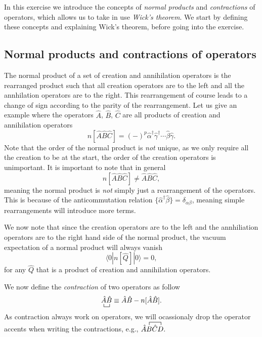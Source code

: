 \documentclass[a4paper, 11pt, notitlepage, english]{article}
\newcommand{\op}[1]{\hat{#1}}
\newcommand{\braopket}[3]{\langle #1 | {#2} | #3 \rangle}
\begin{document}
In this exercise we introduce the concepts of \emph{normal products} and \emph{contractions} of operators, which allows us to take in use \emph{Wick's theorem}. We start by defining these concepts and explaining Wick's theorem, before going into the exercise.

\subsection*{Normal products and contractions of operators}
The normal product of a set of creation and annihilation operators is the rearranged product such that all creation operators are to the left and all the annhilation operators are to the right. This rearrangement of course leads to a change of sign according to the parity of the rearrangement. Let us give an example where the operators $\op{A}$, $\op{B}$, $\op{C}$ are all products of creation and annihilation operators
$$n[\op{A}\op{B}\op{C}] = (-)^p \op{\alpha}^\dag \op{\gamma}^\dag \cdots \op{\beta}\op{\gamma}.$$
Note that the order of the normal product is \emph{not} unique, as we only require all the creation to be at the start, the order of the creation operators is unimportant. It is important to note that in general 
$$n[\op{A}\op{B}\op{C}] \neq \op{A}\op{B}\op{C},$$
meaning the normal product is \emph{not} simply just a rearrangement of the operators. This is because of the anticommutation relation $\{\op{\alpha}^\dag \op{\beta}\} = \delta_{\alpha \beta}$, meaning simple rearrangements will introduce more terms.

We now note that since the creation operators are to the left and the annhiliation operators are to the right hand side of the normal product, the vacuum expectation of a normal product will always vanish
$$\braopket{0}{n[\op{Q}]}{0} = 0,$$
for any $\op{Q}$ that is a product of creation and annihilation operators.


We now define the \emph{contraction} of two operators as follow
$$\bcontraction{}{\op{A}}{}{\op{B}} \op{A}\op{B} \equiv \op{A}\op{B} - n[\op{A}\op{B}].$$
As contraction always work on operators, we will ocassionaly drop the operator accents when writing the contractions, e.g., $\contraction{\op{A}}{B}{\op{C}}{D} \op{A}B\op{C}D.$
\end{document}
